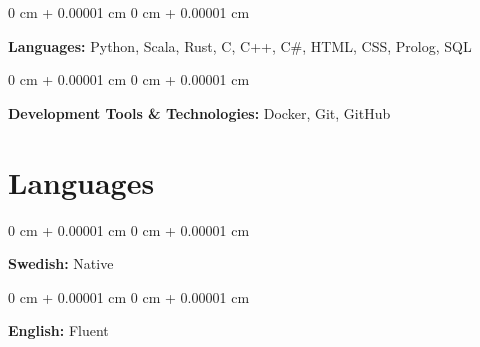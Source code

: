 \documentclass[10pt, letterpaper]{article}
\newenvironment{onecolentry}{
    \begin{adjustwidth}{
        0 cm + 0.00001 cm
    }{
        0 cm + 0.00001 cm
    }
}{
    \end{adjustwidth}
} %
\begin{document}
        
        \begin{onecolentry}
            \textbf{Languages:} Python, Scala, Rust, C, C++, C\#, HTML, CSS, Prolog, SQL
        \end{onecolentry}

        \vspace{0.2 cm}

        \begin{onecolentry}
            \textbf{Development Tools \& Technologies:} Docker, Git, GitHub
        \end{onecolentry}


    
    \section{Languages}



        
        \begin{onecolentry}
            \textbf{Swedish:} Native
        \end{onecolentry}

        \vspace{0.2 cm}

        \begin{onecolentry}
            \textbf{English:} Fluent
        \end{onecolentry}


    
\end{document}
